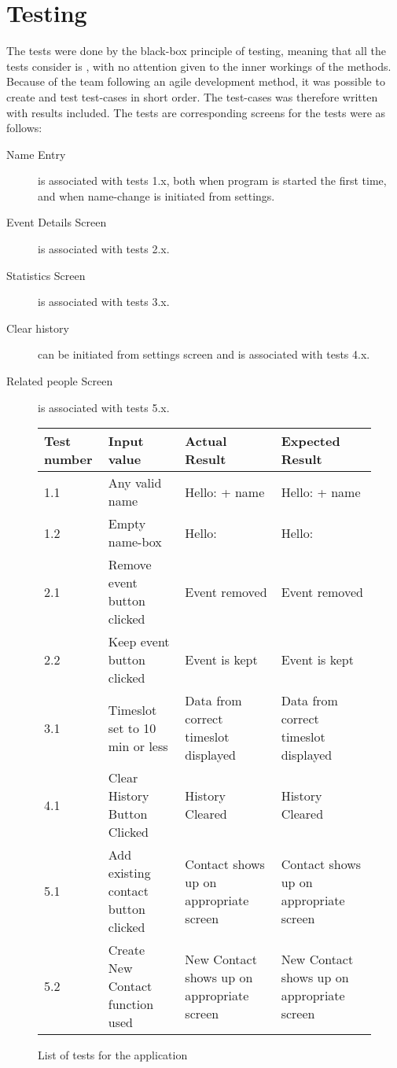 \section{Testing}
The tests were done by the black-box principle of testing, meaning that all the tests consider is , with no attention given to the inner workings of the methods. Because of the team following an agile development method, it was possible to create and test test-cases in short order. The test-cases was therefore written with results included.
The tests are corresponding screens for the tests were as follows:
\begin{description}
\item[Name Entry] is associated with tests 1.x, both when program is started the first time, and when name-change is initiated from settings.
\item[Event Details Screen] is associated with tests 2.x.
\item[Statistics Screen] is associated with tests 3.x.
\item[Clear history] can be initiated from settings screen and is associated with tests 4.x.
\item[Related people Screen] is associated with tests 5.x. 
\end{description}

\begin{figure}[h]
\label{tab:testList}
\caption{List of tests for the application}
\begin{tabular}{|p{}||p{}|p{}|p{}|}
\hline
Test number & Input value& Actual Result& Expected Result \\
\hline
\hline 
1.1 & Any valid name & Hello: + name & Hello: + name \\ 
\hline 
1.2 & Empty name-box & Hello: &Hello:  \\ 
\hline 
2.1 & Remove event button clicked & Event removed & Event removed \\ 
\hline 
2.2 & Keep event button clicked & Event is kept & Event is kept \\ 
\hline 
3.1 & Timeslot set to 10 min or less & Data from correct timeslot displayed & Data from correct timeslot displayed \\ 
\hline 
4.1 & Clear History Button Clicked & History Cleared & History Cleared \\ 
\hline 
5.1 & Add existing contact button clicked & Contact shows up on appropriate screen  & Contact shows up on appropriate screen \\ 
\hline 
5.2 & Create New Contact function used & New Contact shows up on appropriate screen & New Contact shows up on appropriate screen \\ 
\hline 

\end{tabular} 
\end{figure}
